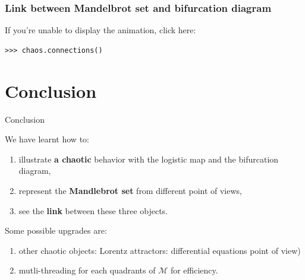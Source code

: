 \documentclass[11pt, compress, tikz]{beamer}
\theoremstyle{definition}
\begin{document}
\begin{frame}[fragile]
\frametitle{Link between Mandelbrot set and bifurcation diagram}
If you're unable to display the animation, click here:
\href{https://www.youtube.com/watch?v=xYQbqML1eE4}{}
\begin{verbatim}
>>> chaos.connections()
\end{verbatim}


\end{frame}

\section[]{Conclusion}
\begin{frame}{Conclusion}
\begin{center}
We have learnt how to:
\end{center}
\begin{box2}{
\begin{enumerate}[label=$\bullet$]
\item illustrate \textbf{a chaotic} behavior with the logistic map and the bifurcation diagram,
\item represent the \textbf{Mandlebrot set} from different point of views,
\item see the \textbf{link} between these three objects.
\end{enumerate}}
\end{box2}
\begin{center}
Some possible upgrades are:
\end{center}
\begin{box2}{
\begin{enumerate}[label=\ding{42}]
\item other chaotic objects: Lorentz attractors: differential equations point of view)
\item mutli-threading for each quadrants of $\mathcal{M}$ for efficiency.
\end{enumerate}}
\end{box2}
\end{frame}  
\end{document}
